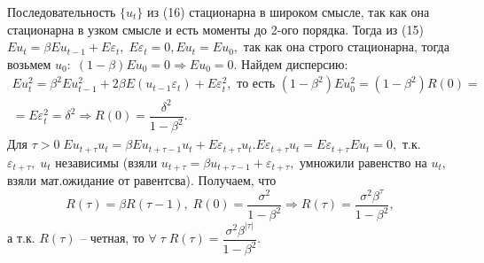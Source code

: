 \begin{Proof}
\begin{enumerate}
        Последовательность $\lbrace u_t \rbrace$ из (16) стационарна в широком смысле, так как она стационарна в узком смысле и есть моменты до 2-ого порядка. Тогда из (15) $Eu_t = \beta Eu_{t - 1} + E\varepsilon_t, \; E\varepsilon_t = 0, Eu_t = Eu_0, $ так как она строго стационарна, тогда возьмем $u_0: \; (1 - \beta)Eu_0 = 0 \Longrightarrow Eu_0 = 0.$ Найдем дисперсию:
        $$\begin{gathered}
            Eu_t^2 = \beta^2Eu_{t - 1}^2 + 2\beta E(u_{t - 1}\varepsilon_t) + E\varepsilon_t^2, \text{ то есть } (1 - \beta^2)Eu_0^2 = (1 - \beta^2)R(0) =\\
            = E\varepsilon_t^2 = \delta^2 \Longrightarrow R(0) = \dfrac{\delta^2}{1 - \beta^2}.
        \end{gathered}$$
        Для $\tau > 0 \; Eu_{t + \tau}u_t = \beta Eu_{t + \tau - 1}u_t + E\varepsilon_{t + \tau}u_t. E\varepsilon_{t + \tau}u_t = E\varepsilon_{t + \tau}Eu_t = 0,$ т.к. $\varepsilon_{t + \tau}, \; u_t$ независимы (взяли $u_{t + \tau} = \beta u_{t + \tau - 1} + \varepsilon_{t + \tau},$ умножили равенство на $u_t,$ взяли мат.ожидание от равентсва). Получаем, что 
        $$R(\tau) = \beta R(\tau - 1), \; R(0) = \dfrac{\sigma^2}{1 - \beta^2} \Longrightarrow R(\tau) = \dfrac{\sigma^2 \beta^{\tau}}{1 - \beta^2},$$
        а т.к. $R(\tau)$ -- четная, то $\forall \; \tau \; R(\tau) = \dfrac{\sigma^2 \beta^{|\tau|}}{1 - \beta^2}$.
    \end{enumerate}
\end{Proof}

